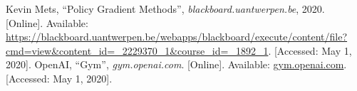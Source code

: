 \documentclass{article}
\begin{document}


 \begin{thebibliography}{9}
   Kevin Mets, ``Policy Gradient Methods'', \textit{blackboard.uantwerpen.be}, 2020. [Online]. Available: \url{https://blackboard.uantwerpen.be/webapps/blackboard/execute/content/file?cmd=view&content_id=_2229370_1&course_id=_1892_1}. [Accessed: May 1, 2020].
   OpenAI, ``Gym'', \textit{gym.openai.com}. [Online]. Available: \url{gym.openai.com}. [Accessed: May 1, 2020].
 \end{thebibliography}
\end{document}
